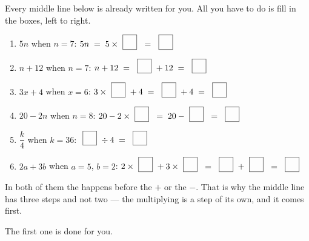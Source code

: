 \documentclass[12pt,a4paper]{article}
\newcommand{\nbox}{\ \fbox{\rule{0pt}{1.05em}\rule{1.0em}{0pt}}\ }
\begin{document}

\noindent Every middle line below is already written for you. All you have to do
is fill in the boxes, left to right.

\vspace{7pt}
\begin{enumerate}[label=(\alph*), itemsep=15pt]
  \item $5n$ \quad when $n = 7$: \hfill
        $5n \;=\; 5 \times \nbox \;=\; \nbox$
  \item $n + 12$ \quad when $n = 7$: \hfill
        $n + 12 \;=\; \nbox + 12 \;=\; \nbox$
  \item $3x + 4$ \quad when $x = 6$: \hfill
        $3 \times \nbox + 4 \;=\; \nbox + 4 \;=\; \nbox$
  \item $20 - 2n$ \quad when $n = 8$: \hfill
        $20 - 2 \times \nbox \;=\; 20 - \nbox \;=\; \nbox$
  \item $\dfrac{k}{4}$ \quad when $k = 36$: \hfill
        $\nbox \div 4 \;=\; \nbox$
  \item $2a + 3b$ \quad when $a = 5$, $b = 2$: \hfill
        $2 \times \nbox + 3 \times \nbox \;=\; \nbox + \nbox \;=\; \nbox$
\end{enumerate}

\begin{remember}
  In both of them the  happens before the $+$ or the $-$. That is why
  the middle line has three steps and not two --- the multiplying is a step of
  its own, and it comes first.
\end{remember}


\noindent The first one is done for you.
\end{document}
